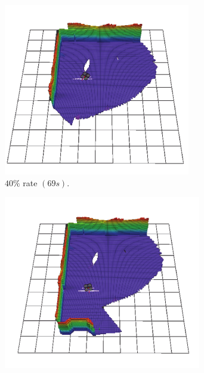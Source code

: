 \documentclass[11pt,openany]{book}
\begin{document}
\begin{figure}[H]
\begin{subfigure}[H]{0.3\linewidth}
        \label{fig:3.13c}
    \end{subfigure}
    \begin{subfigure}[H]{0.3\linewidth}
        \centering
        \includegraphics[width=\linewidth]{assets/3_13_d.png}
        \caption{{$40\%$ rate $(69s).$}}
        \label{fig:3.13d}
    \end{subfigure}
    \begin{subfigure}[H]{0.3\linewidth}
        \centering
        \includegraphics[width=\linewidth]{assets/3_13_e.png}

\end{subfigure}
\end{figure}
\end{document}
